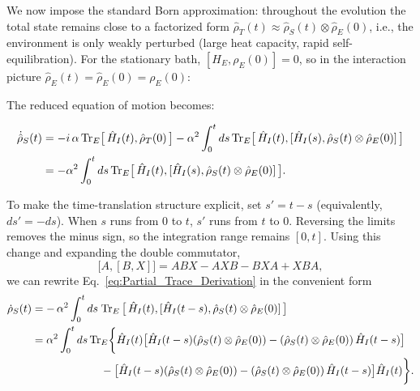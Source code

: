 \noindent
We now impose the standard Born approximation: throughout the evolution the total state remains close to a factorized form $\hat{\rho}_T(t) \approx \hat{\rho}_S(t) \otimes \hat{\rho}_E(0)$, i.e., the environment is only weakly perturbed (large heat capacity, rapid self-equilibration). For the stationary bath, $[H_E, \rho_E(0)]=0$, so in the interaction picture $\hat{\rho}_E(t)=\hat{\rho}_E(0)=\rho_E(0)$:

\noindent
The reduced equation of motion becomes:

\begin{align}
	\dot{\hat{\rho}}_S(t) & = -i \, \alpha \, \mathrm{Tr}_E\big[\,\hat{H}_I(t),\hat{\rho}_T(0)\,\big]
	- \alpha^2 \int_0^t ds\, \mathrm{Tr}_E \big[\,\hat{H}_I(t), [\hat{H}_I(s), \hat{\rho}_S(t) \otimes \hat{\rho}_E(0)] \,\big] \notag                     \\
	                      & = - \alpha^2 \int_0^t ds\, \mathrm{Tr}_E \big[\,\hat{H}_I(t), [\hat{H}_I(s), \hat{\rho}_S(t) \otimes \hat{\rho}_E(0)] \,\big].
	\label{eq:Partial_Trace_Derivation}
\end{align}

\noindent
To make the time-translation structure explicit, set $s' = t-s$ (equivalently, $ds' = -ds$). When $s$ runs from $0$ to $t$, $s'$ runs from $t$ to $0$. Reversing the limits removes the minus sign, so the integration range remains $[0,t]$. Using this change and expanding the double commutator,
\begin{equation}
	\label{eq:double_comm_expansion_rule}
	\big[ A, [B, X] \big] = A B X - A X B - B X A + X B A,
\end{equation}
we can rewrite Eq.~\eqref{eq:Partial_Trace_Derivation} in the convenient form
\begin{align}
	\dot{\rho}_S(t) & = - \, \alpha^2 \int_0^t ds\; \mathrm{Tr}_E \, \big[\, \hat{H}_I(t), [\hat{H}_I(t-s), \hat{\rho}_S(t) \otimes \hat{\rho}_E(0)] \,\big] \notag                          \\
	                & = \alpha^2 \int_0^t ds \, \mathrm{Tr}_E \bigg\{
	\hat{H}_I(t) \big[ \hat{H}_I(t-s) (\hat{\rho}_S(t) \otimes \hat{\rho}_E(0)) - (\hat{\rho}_S(t) \otimes \hat{\rho}_E(0)) \, \hat{H}_I(t-s) \big] \notag                                   \\
	                & \qquad\qquad\qquad\; - \big[ \hat{H}_I(t-s) (\hat{\rho}_S(t) \otimes \hat{\rho}_E(0)) - (\hat{\rho}_S(t) \otimes \hat{\rho}_E(0)) \, \hat{H}_I(t-s) \big] \hat{H}_I(t)
	\bigg\}.
	\label{eq:Second_Order_Final_Expression}
\end{align}


